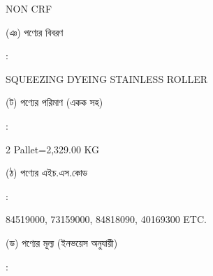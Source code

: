 \documentclass[12pt]{article}
\newcommand{\good}{SQUEEZING DYEING STAINLESS ROLLER}
\newcommand{\pkg}{2 Pallet=2,329.00 KG}
\newcommand{\hscode}{84519000, 73159000, 84818090, 40169300 ETC.}
\newcommand{\crf}{NON CRF}
\newcommand{\crfdt}{}
\begin{document}
\begin{minipage}[t]{0.53\linewidth}
{\crf} \hspace{2em} {\crfdt}
\\
\end{minipage}
\begin{minipage}[t]{0.05\linewidth}
\hspace*{1em}
\end{minipage}
\begin{minipage}[t]{0.40\linewidth}
(ঞ) পণ্যের বিবরণ
\end{minipage}
\begin{minipage}[t]{0.02\linewidth}
:
\end{minipage}
\begin{minipage}[t]{0.53\linewidth}
{\good}
\\
\end{minipage}
\begin{minipage}[t]{0.05\linewidth}
\hspace*{1em}
\end{minipage}
\begin{minipage}[t]{0.40\linewidth}
(ট) পণ্যের পরিমাণ (একক সহ)
\end{minipage}
\begin{minipage}[t]{0.02\linewidth}
:
\end{minipage}
\begin{minipage}[t]{0.53\linewidth}
{\pkg}
\\
\end{minipage}
\begin{minipage}[t]{0.05\linewidth}
\hspace*{1em}
\end{minipage}
\begin{minipage}[t]{0.40\linewidth}
(ঠ) পণ্যের এইচ.এস.কোড
\end{minipage}
\begin{minipage}[t]{0.02\linewidth}
:
\end{minipage}
\begin{minipage}[t]{0.53\linewidth}
{\hscode}
\\
\end{minipage}
\begin{minipage}[t]{0.05\linewidth}
\hspace*{1em}
\end{minipage}
\begin{minipage}[t]{0.40\linewidth}
(ড) পণ্যের মূল্য (ইনভয়েস অনুযায়ী)
\end{minipage}
\begin{minipage}[t]{0.02\linewidth}
:
\end{minipage}
\end{document}
